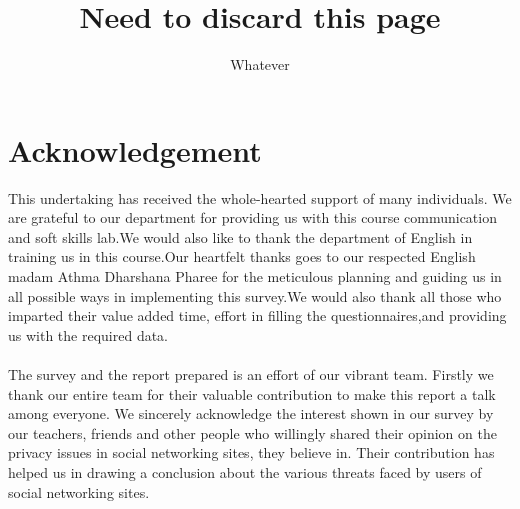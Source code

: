 \documentclass{book}
\begin{document}
\pagestyle{empty}
\title{\textbf{Need to discard this page}}
\author{Whatever}



\maketitle





\pagestyle{fancy}
\fancyhf{}
\lhead[]{\thepage}
\rhead[\thepage]{}


\doublespacing



\chapter*{Acknowledgement}

This undertaking has received the whole-hearted support of many individuals. We are grateful to our department for providing us with this course communication and soft skills lab.We would also like to thank the department of English in training us in this course.Our heartfelt thanks goes to our respected English madam Athma Dharshana Pharee for the meticulous planning and guiding us in all possible ways in implementing this survey.We would also thank all those who imparted their value added time, effort in filling the questionnaires,and providing us with the required  data.
\\\\
The survey and the report prepared is an effort of our vibrant team. Firstly we  thank our entire team for their valuable contribution to make this report a talk among everyone.
We sincerely acknowledge the interest shown in our survey by our teachers, friends and other people who willingly shared their opinion on the privacy issues in social networking sites, they believe in. Their contribution has helped us in drawing a conclusion about the various threats faced by users of social networking sites.
\newpage
\thispagestyle{empty}
\end{document}
